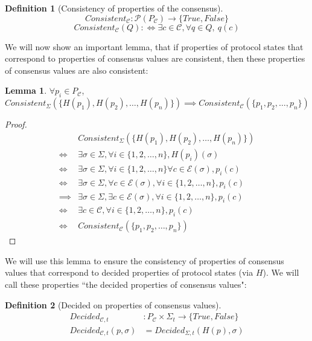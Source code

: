 \documentclass{article}
\theoremstyle{definition}
\newtheorem{lemma}{Lemma}
\newtheorem{defn}{Definition}[section]
\begin{document}
\begin{defn}[Consistency of properties of the consensus]
$$Consistent_{\mathcal{C}} : \mathcal{P}(P_{\mathcal{C}}) \to \{True, False\}$$
$$Consistent_{\mathcal{C}}(Q): \Leftrightarrow \exists c \in \mathcal{C}, \forall q \in Q, ~ q(c)$$
\end{defn}

We will now show an important lemma, that if properties of protocol states that correspond to properties of consensus values are consistent, then these properties of consensus values are also consistent:

\begin{lemma}
$\forall p_i \in P_{\mathcal{C}}$,
$$
Consistent_\Sigma(\{H(p_1), H(p_2),\dots,H(p_n)\}) \implies Consistent_{\mathcal{C}}(\{p_1,p_2,\dots,p_n\})
$$
\end{lemma}

\begin{proof}
\begin{align}
&Consistent_\Sigma(\{H(p_1), H(p_2), \dots, H(p_n)\}) \\
\iff &\exists \sigma \in \Sigma, \forall i \in \{1,2,\dots,n\}, H(p_i)(\sigma) \\
\iff &\exists \sigma \in \Sigma, \forall i \in \{1,2,\dots,n\} \forall c \in \mathcal{E}(\sigma), p_i(c) \\
\iff &\exists \sigma \in \Sigma, \forall c \in \mathcal{E}(\sigma), \forall i \in \{1,2,\dots,n\}, p_i(c) \\
\implies &\exists \sigma \in \Sigma, \exists c \in \mathcal{E}(\sigma), \forall i \in \{1,2,\dots,n\}, p_i(c) \\
\iff &\exists c \in \mathcal{C}, \forall i \in \{1,2,\dots,n\}, p_i(c) \\
\iff &Consistent_{\mathcal{C}}(\{p_1,p_2,\dots,p_n\})
\end{align}
\end{proof}

We will use this lemma to ensure the consistency of properties of consensus values that correspond to decided properties of protocol states (via $H$). We will call these properties ``the decided properties of consensus values":

\begin{defn}[Decided on properties of consensus values]
\begin{align}
Decided_{\mathcal{C},t}&: P_{\mathcal{C}} \times \Sigma_t \to \{True, False\} \\
Decided_{\mathcal{C},t}(p, \sigma)&= Decided_{\Sigma,t}(H(p), \sigma)
\end{align}
\end{defn}
\end{document}
